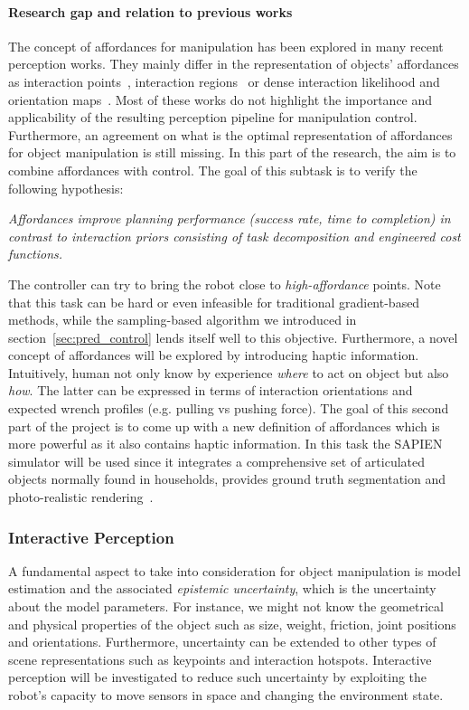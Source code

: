\paragraph{Research gap and relation to previous works} The concept of affordances for manipulation has been explored in many recent perception works. They mainly differ in the representation of objects' affordances as interaction points~\cite{gao2021kpam}, interaction regions~\cite{nagarajan2019grounded} or dense interaction likelihood and orientation maps~\cite{mo2021where2act}. Most of these works do not highlight the importance and applicability of the resulting perception pipeline for manipulation control. Furthermore, an agreement on what is the optimal representation of affordances for object manipulation is still missing. In this part of the research, the aim is to combine affordances with control. The goal of this subtask is to verify the following hypothesis:
\begin{displayquote}
\textit{Affordances improve planning performance (success rate, time to completion) in contrast to interaction priors consisting of task decomposition and engineered cost functions.}
\end{displayquote}
The controller can try to bring the robot close to \emph{high-affordance} points. Note that this task can be hard or even infeasible for traditional gradient-based methods, while the sampling-based algorithm we introduced in section~\ref{sec:pred_control} lends itself well to this objective. 
Furthermore, a novel concept of affordances will be explored by introducing haptic information. Intuitively, human not only know by experience \emph{where} to act on object but also \emph{how}. The latter can be expressed in terms of interaction orientations and expected wrench profiles (e.g. pulling vs pushing force). The goal of this second part of the project is to come up with a new definition of affordances which is more powerful as it also contains haptic information. In this task the SAPIEN simulator will be used since it integrates a comprehensive set of articulated objects normally found in households, provides ground truth segmentation and photo-realistic rendering~\cite{Xiang_2020_SAPIEN}. 

\subsubsection{Interactive Perception}
A fundamental aspect to take into consideration for object manipulation is model estimation and the associated \emph{epistemic uncertainty}, which is the uncertainty about the model parameters. For instance, we might not know the geometrical and physical properties of the object such as size, weight, friction, joint positions and orientations. Furthermore, uncertainty can be extended to other types of scene representations such as keypoints and interaction hotspots. Interactive perception will be investigated to reduce such uncertainty by exploiting the robot's capacity to move sensors in space and changing the environment state.

